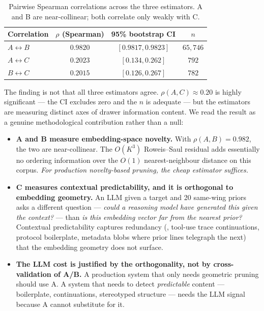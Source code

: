 \documentclass[11pt]{article}
\begin{document}
\begin{table}[h]
\centering
\begin{tabular}{lccc}
\toprule
Correlation & $\rho$ (Spearman) & 95\% bootstrap CI & $n$ \\
\midrule
$A \leftrightarrow B$ & $0.9820$ & $[0.9817, 0.9823]$ & $65{,}746$ \\
$A \leftrightarrow C$ & $0.2023$ & $[0.134, 0.262]$ & $792$ \\
$B \leftrightarrow C$ & $0.2015$ & $[0.126, 0.267]$ & $782$ \\
\bottomrule
\end{tabular}
\caption{Pairwise Spearman correlations across the three estimators.
  A and B are near-collinear; both correlate only weakly with C.}
\label{tab:corrs}
\end{table}

The finding is not that all three estimators agree. $\rho(A,C) \approx
0.20$ is highly significant --- the CI excludes zero and the $n$ is
adequate --- but the estimators are measuring distinct axes of drawer
information content. We read the result as a genuine
methodological contribution rather than a null:

\begin{itemize}
  \item \textbf{A and B measure embedding-space novelty.} With
    $\rho(A,B) = 0.982$, the two are near-collinear.
    The $O(K^3)$ Roweis--Saul residual adds essentially no ordering
    information over the $O(1)$ nearest-neighbour distance on this
    corpus. \emph{For production novelty-based pruning, the cheap
    estimator suffices.}
  \item \textbf{C measures contextual predictability, and it is
    orthogonal to embedding geometry.} An LLM given a target and 20
    same-wing priors asks a different question --- \emph{could a
    reasoning model have generated this given the context?} --- than
    \emph{is this embedding vector far from the nearest prior?}
    Contextual predictability captures redundancy (\eg,
    tool-use trace continuations, protocol boilerplate,
    metadata blobs where prior lines telegraph the next) that the
    embedding geometry does not surface.
  \item \textbf{The LLM cost is justified by the orthogonality,
    not by cross-validation of A/B.} A production system that only
    needs geometric pruning should use A. A system that needs to
    detect \emph{predictable} content --- boilerplate, continuations,
    stereotyped structure --- needs the LLM signal because A cannot
    substitute for it.
\end{itemize}
\end{document}
